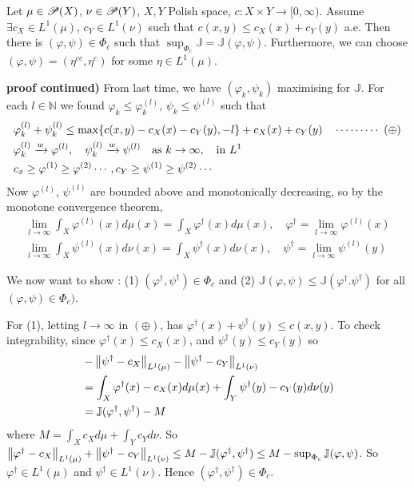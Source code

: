 \documentclass[12pt,a4paper]{article}
\newenvironment{proof}
{\begin{changemargin}{1cm}{0.5cm} 
	}%
	{\end{changemargin}
}
\newenvironment{p}
{\begin{proof} 
	}%
	{\end{proof}
}
\begin{document}
 Let $\mu \in \mathscr{P}(X)$, $\nu \in \mathscr{P}(Y)$, $X, Y$ Polish space, $c: X\times Y\rightarrow [0, \infty)$. Assume $\exists c_X \in L^1(\mu)$, $c_Y \in L^1(\nu)$ such that $c(x,y)\leq c_X(x) + c_Y(y)$ a.e. Then there is $(\varphi, \psi) \in \Phi_c$ such that $\sup_{\Phi_c} \mathbb{J} = \mathbb{J}(\varphi, \psi)$. Furthermore, we can choose $(\varphi, \psi) = (\eta^{cc}, \eta^c)$ for some $\eta \in L^1(\mu)$.
\begin{p}
\textbf{proof continued)} From last time, we have $(\varphi_k, \psi_k)$ maximising for $\mathbb{J}$. For each $l\in \mathbb{N}$ we found $\varphi_k \leq \varphi_k^{(l)}$, $\psi_k \leq \psi^{(l)}$ such that
\begin{align*}
& \varphi_k^{(l)} + \psi_k^{(l)} \leq \max \{c(x,y) - c_X(x)- c_Y(y), -l \} + c_X(x) + c_Y(y) \quad \cdots\cdots\cdots\,\,(\oplus) \\
& \varphi_k^{(l)} \xrightarrow{w} \varphi^{(l)}, \quad \psi_k^{(l)} \xrightarrow{w} \psi^{(l)} \quad \text{as } k\rightarrow \infty, \quad \text{in }L^1 \\
& c_x \geq \varphi^{(1)} \geq \varphi^{(2)} \cdots, c_Y \geq \psi^{(1)} \geq \psi^{(2)} \cdots
\end{align*}
Now $\varphi^{(l)}$, $\psi^{(l)}$ are bounded above and monotonically decreasing, so by the monotone convergence theorem,
\begin{align*}
\lim_{l\rightarrow \infty} \int_X \varphi^{(l)}(x) d\mu(x) = \int_X \varphi^{\dagger}(x) d\mu(x), \quad \varphi^{\dagger} = \lim_{l\rightarrow \infty} \varphi^{(l)}(x) \\
\lim_{l\rightarrow \infty} \int_X \psi^{(l)}(x) d\nu(x) = \int_X \psi^{\dagger}(x) d\nu(x), \quad \psi^{\dagger} = \lim_{l\rightarrow \infty} \psi^{(l)}(y)
\end{align*}
\s

We now want to show : (1) $(\varphi^{\dagger}, \psi^{\dagger}) \in \Phi_c$ and (2) $\mathbb{J}(\varphi, \psi) \leq \mathbb{J}(\varphi^{\dagger}. \psi^{\dagger})$ for all $(\varphi, \psi)\in \Phi_c)$.

\quad For (1), letting $l\rightarrow \infty$ in $(\oplus)$,  has $\varphi^{\dagger}(x) + \psi^{\dagger}(y) \leq c(x,y)$. To check integrability, since $\varphi^{\dagger}(x) \leq c_X(x)$, and $\psi^{\dagger}(y) \leq c_Y(y)$ so
\begin{align*}
& - \bigl\lVert\psi^{\dagger}- c_X\bigr\rVert_{L^1(\mu)} - \bigl\lVert\psi^{\dagger} - c_Y\bigr\rVert_{L^1(\nu)} \\
& = \int_X \varphi^{\dagger}(x) - c_X(x) d\mu(x) + \int_Y \psi^{\dagger} (y) - c_Y(y)d\nu(y) \\
& = \mathbb{J}(\varphi^{\dagger}, \psi^{\dagger}) -M
\end{align*}
where $M = \int_X c_X d\mu + \int_Y c_Y d\nu$. So $\bigl\lVert\varphi^{\dagger}- c_X\bigr\rVert_{L^1(\mu)} + \bigl\lVert\psi^{\dagger} - c_Y\bigr\rVert_{L^1(\nu)} \leq M - \mathbb{J}(\varphi^{\dagger}, \psi^{\dagger}) \leq M - \sup_{\Phi_c} \mathbb{J}(\varphi, \psi)$. So $\varphi^{\dagger} \in L^1(\mu)$ and $\psi^{\dagger} \in L^1(\nu)$. Hence $(\varphi^{\dagger}, \psi^{\dagger}) \in \Phi_c$.


\end{p}
\end{document}
